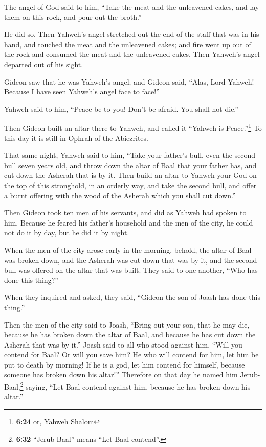 The angel of God said to him, ``Take the meat and the
unleavened cakes, and lay them on this rock, and pour out the broth.''

He did so.  Then Yahweh's angel stretched out the end of
the staff that was in his hand, and touched the meat and the unleavened
cakes; and fire went up out of the rock and consumed the meat and the
unleavened cakes. Then Yahweh's angel departed out of his sight.

 Gideon saw that he was Yahweh's angel; and Gideon said,
``Alas, Lord Yahweh! Because I have seen Yahweh's angel face to face!''

 Yahweh said to him, ``Peace be to you! Don't be afraid.
You shall not die.''

 Then Gideon built an altar there to Yahweh, and called
it ``Yahweh is Peace.''\footnote{\textbf{6:24} or, Yahweh Shalom} To
this day it is still in Ophrah of the Abiezrites.

 That same night, Yahweh said to him, ``Take your
father's bull, even the second bull seven years old, and throw down the
altar of Baal that your father has, and cut down the Asherah that is by
it.  Then build an altar to Yahweh your God on the top of
this stronghold, in an orderly way, and take the second bull, and offer
a burnt offering with the wood of the Asherah which you shall cut
down.''

 Then Gideon took ten men of his servants, and did as
Yahweh had spoken to him. Because he feared his father's household and
the men of the city, he could not do it by day, but he did it by night.

 When the men of the city arose early in the morning,
behold, the altar of Baal was broken down, and the Asherah was cut down
that was by it, and the second bull was offered on the altar that was
built.  They said to one another, ``Who has done this
thing?''

When they inquired and asked, they said, ``Gideon the son of Joash has
done this thing.''

 Then the men of the city said to Joash, ``Bring out your
son, that he may die, because he has broken down the altar of Baal, and
because he has cut down the Asherah that was by it.'' 
Joash said to all who stood against him, ``Will you contend for Baal? Or
will you save him? He who will contend for him, let him be put to death
by morning! If he is a god, let him contend for himself, because someone
has broken down his altar!''  Therefore on that day he
named him Jerub-Baal,\footnote{\textbf{6:32} ``Jerub-Baal'' means ``Let
  Baal contend''.} saying, ``Let Baal contend against him, because he
has broken down his altar.''

